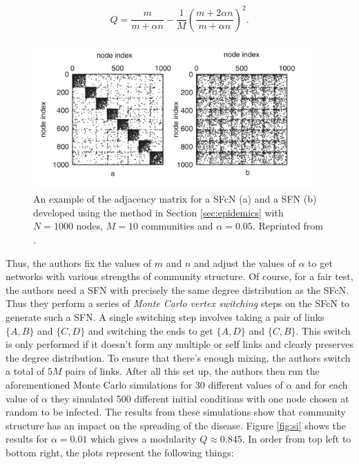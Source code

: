 $$ Q = \frac{m}{m + \alpha n} - \frac{1}{M}\left(\frac{m + 2\alpha n}{m + \alpha n}\right)^2. $$

\begin{figure}
    \begin{center}
        \includegraphics[width=0.95\textwidth]{img/4/sfcns}
    \end{center}
    \caption{An example of the adjacency matrix for a SFcN (a) and a SFN (b) developed using the method in Section \ref{sec:epidemics} with $N = 1000$ nodes, $M = 10$ communities and $\alpha = 0.05$. Reprinted from \cite{Huang_2007}.}
    \label{fig:sfcns}
\end{figure}

Thus, the authors fix the values of $m$ and $n$ and adjust the values of $\alpha$ to get networks with various strengths of community structure. Of course, for a fair test, the authors need a SFN with precisely the same degree distribution as the SFcN. Thus they perform a series of \emph{Monte Carlo vertex switching} steps on the SFcN to generate such a SFN. A single switching step involves taking a pair of links $\{A, B\}$ and $\{C, D\}$ and switching the ends to get $\{A, D\}$ and $\{C, B\}$. This switch is only performed if it doesn't form any multiple or self links and clearly preserves the degree distribution. To ensure that there's enough mixing, the authors switch a total of $5M$ pairs of links. After all this set up, the authors then run the aforementioned Monte Carlo simulations for 30 different values of $\alpha$ and for each value of $\alpha$ they simulated 500 different initial conditions with one node chosen at random to be infected. The results from these simulations show that community structure has an impact on the spreading of the disease. Figure \ref{fig:si} shows the results for $\alpha = 0.01$ which gives a modularity $Q \approx 0.845$. In order from top left to bottom right, the plots represent the following things:

